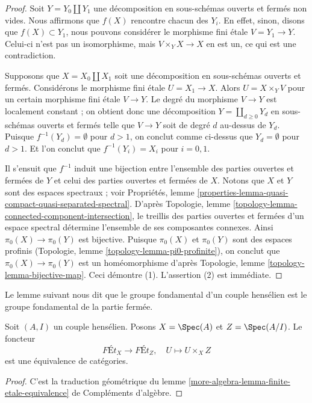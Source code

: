 \begin{proof}
Soit $Y = Y_0 \amalg Y_1$ une décomposition en sous-schémas ouverts et fermés
non vides. Nous affirmons que $f(X)$ rencontre chacun des $Y_i$. En effet, sinon,
disons que $f(X) \subset Y_1$, nous pouvons considérer le morphisme fini étale
$V = Y_1 \to Y$. Celui-ci n'est pas un isomorphisme,
mais $V \times_Y X \to X$ en est un, ce qui
est une contradiction.

\medskip\noindent
Supposons que $X = X_0 \amalg X_1$ soit une décomposition en sous-schémas
ouverts et fermés. Considérons le morphisme fini étale $U = X_1 \to X$. Alors
$U = X \times_Y V$ pour un certain morphisme fini étale $V \to Y$. Le degré
du morphisme $V \to Y$ est localement constant ; on obtient donc une décomposition
$Y = \coprod_{d \geq 0} Y_d$ en sous-schémas ouverts et fermés
telle que $V \to Y$ soit de degré $d$ au-dessus de $Y_d$. Puisque
$f^{-1}(Y_d) = \emptyset$ pour $d > 1$, on conclut comme ci-dessus que $Y_d = \emptyset$
pour $d > 1$. Et l'on conclut que $f^{-1}(Y_i) = X_i$
pour $i = 0, 1$.

\medskip\noindent
Il s'ensuit que $f^{-1}$ induit une bijection entre l'ensemble des parties
ouvertes et fermées de $Y$ et celui des parties ouvertes et fermées de $X$.
Notons que $X$ et $Y$ sont des espaces spectraux ; voir Propriétés, lemme
\ref{properties-lemma-quasi-compact-quasi-separated-spectral}.
D'après Topologie, lemme \ref{topology-lemma-connected-component-intersection},
le treillis des parties ouvertes et fermées d'un espace spectral
détermine l'ensemble de ses composantes connexes.
Ainsi $\pi_0(X) \to \pi_0(Y)$ est bijective. Puisque $\pi_0(X)$ et
$\pi_0(Y)$ sont des espaces profinis
(Topologie, lemme \ref{topology-lemma-pi0-profinite}),
on conclut que $\pi_0(X) \to \pi_0(Y)$ est un homéomorphisme d'après
Topologie, lemme \ref{topology-lemma-bijective-map}. Ceci démontre (1).
L'assertion (2) est immédiate.
\end{proof}

\noindent
Le lemme suivant nous dit que le groupe fondamental d'un couple hensélien
est le groupe fondamental de la partie fermée.

\begin{lemma}
\label{lemma-gabber}
Soit $(A, I)$ un couple hensélien. Posons $X = \Spec(A)$ et $Z = \Spec(A/I)$.
Le foncteur
$$
\textit{F\'Et}_X \longrightarrow \textit{F\'Et}_Z,\quad
U \longmapsto U \times_X Z
$$
est une équivalence de catégories.
\end{lemma}

\begin{proof}
C'est la traduction géométrique du
lemme \ref{more-algebra-lemma-finite-etale-equivalence} de Compléments d'algèbre.
\end{proof}

